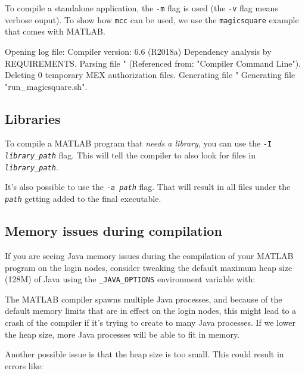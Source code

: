 To compile a standalone application, the \verb|-m|
flag is used (the \verb|-v| flag means verbose ouput).
To show how \verb|mcc| can be used, we use the \verb|magicsquare| example
that comes with MATLAB.

\begin{prompt}
Opening log file:  %
Compiler version: 6.6 (R2018a)
Dependency analysis by REQUIREMENTS.
Parsing file "%
	(Referenced from: "Compiler Command Line").
Deleting 0 temporary MEX authorization files.
Generating file "%
Generating file "run\_magicsquare.sh".
\end{prompt}

\subsection{Libraries}

To compile a MATLAB program that \emph{needs a library}, you can use the
\texttt{-I \emph{library\_path}} flag. This will tell the compiler to also
look for files in \texttt{\emph{library\_path}}.

It's also possible to use the \texttt{-a \emph{path}} flag. That will result in
all files under the \texttt{\emph{path}} getting added to the final executable.

\subsection{Memory issues during compilation}

If you are seeing Java memory issues during the compilation of your MATLAB program
on the login nodes, consider tweaking the default maximum heap size (128M) of Java
using the \verb|_JAVA_OPTIONS| environment variable with:

\begin{prompt}
\end{prompt}

The MATLAB compiler spawns multiple Java processes, and because of the default memory
limits that are in effect on the login nodes, this might lead to a crash of the compiler
if it's trying to create to many Java processes. If we lower the heap size, more
Java processes will be able to fit in memory.

Another possible issue is that the heap size is too small. This could result
in errors like:

